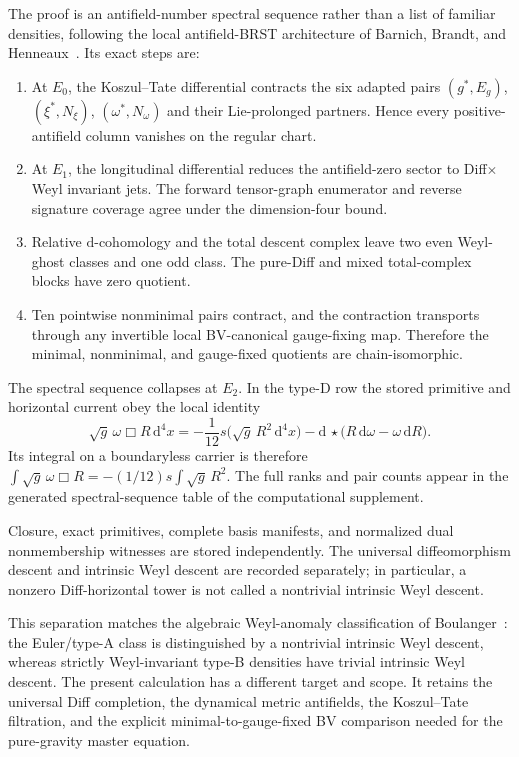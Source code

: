 \documentclass[11pt]{article}
\theoremstyle{definition}
\theoremstyle{remark}
\newcommand{\dd}{\mathrm d}
\begin{document}
The proof is an antifield-number spectral sequence rather than a list of
familiar densities, following the local antifield-BRST architecture of
Barnich, Brandt, and Henneaux~\cite{BarnichBrandtHenneauxI}.  Its exact steps
are:
\begin{enumerate}
\item At $E_0$, the Koszul--Tate differential contracts the six adapted pairs
$(g^*,E_g)$, $(\xi^*,N_\xi)$, $(\omega^*,N_\omega)$ and their Lie-prolonged
partners.  Hence every positive-antifield column vanishes on the regular
chart.
\item At $E_1$, the longitudinal differential reduces the antifield-zero
sector to Diff$\times$Weyl invariant jets.  The forward tensor-graph
enumerator and reverse signature coverage agree under the dimension-four
bound.
\item Relative $\dd$-cohomology and the total descent complex leave two even
Weyl-ghost classes and one odd class.  The pure-Diff and mixed total-complex
blocks have zero quotient.
\item Ten pointwise nonminimal pairs contract, and the contraction transports
through any invertible local BV-canonical gauge-fixing map.  Therefore the
minimal, nonminimal, and gauge-fixed quotients are chain-isomorphic.
\end{enumerate}
The spectral sequence collapses at $E_2$.  In the type-D row the stored
primitive and horizontal current obey the local identity
\[
 \sqrt g\,\omega\Box R\,\dd^4x
 =-\frac1{12}s\bigl(\sqrt g\,R^2\,\dd^4x\bigr)
  -\dd\,\star\bigl(R\,\dd\omega-\omega\,\dd R\bigr).
\]
Its integral on a boundaryless carrier is therefore
$\int\sqrt g\,\omega\Box R
=-(1/12)s\int\sqrt g\,R^2$.
The full ranks and pair counts appear in the generated spectral-sequence
table of the computational supplement.

Closure, exact primitives, complete basis manifests, and normalized dual
nonmembership witnesses are stored independently.  The universal
diffeomorphism descent and intrinsic Weyl descent are recorded separately;
in particular, a nonzero Diff-horizontal tower is not called a nontrivial
intrinsic Weyl descent.

This separation matches the algebraic Weyl-anomaly classification of
Boulanger~\cite{Boulanger}: the Euler/type-A class is distinguished by a
nontrivial intrinsic Weyl descent, whereas strictly Weyl-invariant type-B
densities have trivial intrinsic Weyl descent.  The present calculation has a
different target and scope.  It retains the universal Diff completion, the
dynamical metric antifields, the Koszul--Tate filtration, and the explicit
minimal-to-gauge-fixed BV comparison needed for the pure-gravity master
equation.
\end{document}
